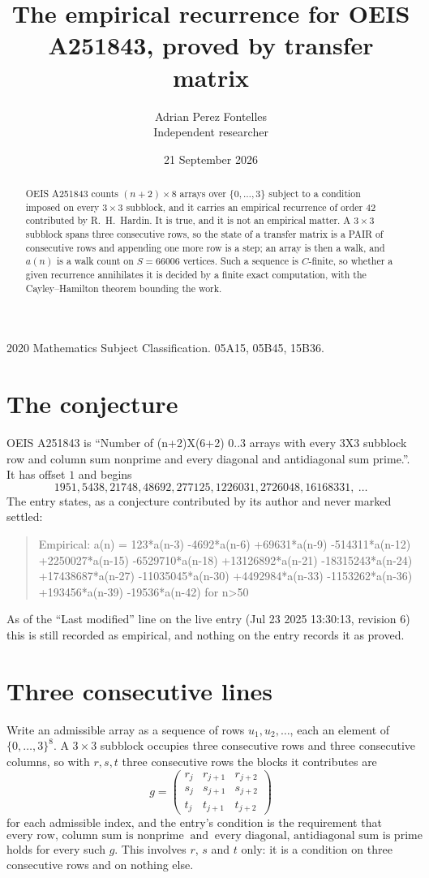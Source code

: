 \documentclass[11pt,a4paper]{article}
\title{The empirical recurrence for OEIS A251843, proved by transfer matrix}
\author{Adrian Perez Fontelles\\ \small Independent researcher}
\date{21 September 2026}
\theoremstyle{plain}
\theoremstyle{definition}
\begin{document}
\maketitle

\begin{abstract}
OEIS A251843 counts $(n+2)\times8$ arrays over $\{0,\dots,3\}$ subject to a condition imposed on
every $3\times3$ subblock, and it carries an empirical recurrence of order $42$
contributed by R.~H.~Hardin. It is true, and it is not an empirical matter. A $3\times3$
subblock spans three consecutive rows, so the state of a transfer matrix is a PAIR of
consecutive rows and appending one more row is a step; an array is then a walk, and
$a(n)$ is a walk count on $S=66006$ vertices. Such a sequence is $C$-finite, so whether a given
recurrence annihilates it is decided by a finite exact computation, with the Cayley--Hamilton
theorem bounding the work.
\end{abstract}

\noindent\small 2020 Mathematics Subject Classification. 05A15, 05B45, 15B36.\normalsize

\section{The conjecture}

OEIS A251843 is ``Number of (n+2)X(6+2) 0..3 arrays with every 3X3 subblock row and column sum nonprime and every diagonal and antidiagonal sum prime.''. It has offset $1$ and begins
\[
1951, 5438, 21748, 48692, 277125, 1226031, 2726048, 16168331,\ \dots
\]
The entry states, as a conjecture contributed by its author and never marked settled:
\begin{quote}
Empirical: a(n) = 123*a(n-3) -4692*a(n-6) +69631*a(n-9) -514311*a(n-12) +2250027*a(n-15) -6529710*a(n-18) +13126892*a(n-21) -18315243*a(n-24) +17438687*a(n-27) -11035045*a(n-30) +4492984*a(n-33) -1153262*a(n-36) +193456*a(n-39) -19536*a(n-42) for n>50
\end{quote}
As of the ``Last modified'' line on the live entry (Jul 23 2025 13:30:13, revision 6) this is still
recorded as empirical, and nothing on the entry records it as proved.

\section{Three consecutive lines}

Write an admissible array as a sequence of rows $u_1,u_2,\dots$, each an element of
$\{0,\dots,3\}^{8}$. A $3\times3$ subblock occupies three consecutive rows and
three consecutive columns, so with $r,s,t$ three consecutive rows the blocks it
contributes are
\[
g=\begin{pmatrix}r_j&r_{j+1}&r_{j+2}\\ s_j&s_{j+1}&s_{j+2}\\ t_j&t_{j+1}&t_{j+2}\end{pmatrix}
\]
for each admissible index, and the entry's condition is the requirement that
\[
\text{every row, column sum is nonprime}\ \text{ and }\ \text{every diagonal, antidiagonal sum is prime}
\]
holds for every such $g$. This involves $r$, $s$ and $t$ only: it is a condition on
three consecutive rows and on nothing else.
\end{document}
